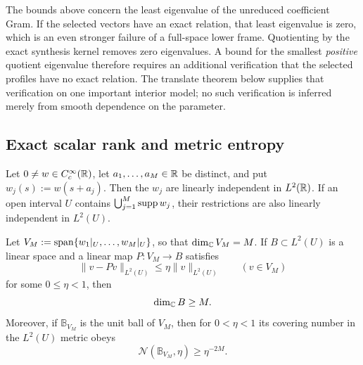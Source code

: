 \begin{remark}
\label{rem:tpc52-unreduced-versus-quotient}
The bounds above concern the least eigenvalue of the unreduced
coefficient Gram.  If the selected vectors have an exact relation, that
least eigenvalue is zero, which is an even stronger failure of a
full-space lower frame.  Quotienting by the exact synthesis kernel
removes zero eigenvalues.  A bound for the smallest \emph{positive}
quotient eigenvalue therefore requires an additional verification that
the selected profiles have no exact relation.  The translate theorem
below supplies that verification on one important interior model; no
such verification is inferred merely from smooth dependence on the
parameter.
\end{remark}

\subsection{Exact scalar rank and metric entropy}

\begin{proposition}
\label{prop:tpc52-translate-rank}
Let \(0\ne w\in C_c^\infty(\mathbb R)\), let
\(a_1,\ldots,a_M\in\mathbb R\) be distinct, and put
\(w_j(s):=w(s+a_j)\).  Then the \(w_j\) are linearly independent in
\(L^2(\mathbb R)\).  If an open interval \(U\) contains
\(\bigcup_{j=1}^M\operatorname{supp} w_j\), their restrictions are also linearly
independent in \(L^2(U)\).

Let \(V_M:=\operatorname{span}\{w_1|_U,\ldots,w_M|_U\}\), so that
\(\dim_\mathbb C V_M=M\).  If \(B\subset L^2(U)\) is a linear space and a
linear map \(P:V_M\to B\) satisfies
\begin{equation}
 \|v-Pv\|_{L^2(U)}\leq\eta\|v\|_{L^2(U)}
 \qquad(v\in V_M)
 \label{eq:tpc52-uniform-relative-scalar-approximation}
\end{equation}
for some \(0\leq\eta<1\), then
\begin{equation}
 \dim_\mathbb C B\geq M.
 \label{eq:tpc52-scalar-rank-lower-bound}
\end{equation}
Moreover, if \(\mathbb B_{V_M}\) is the unit ball of \(V_M\), then
for \(0<\eta<1\) its covering number in the \(L^2(U)\) metric obeys
\begin{equation}
 \mathcal N(\mathbb B_{V_M},\eta)\geq\eta^{-2M}.
 \label{eq:tpc52-translate-entropy}
\end{equation}
\end{proposition}

